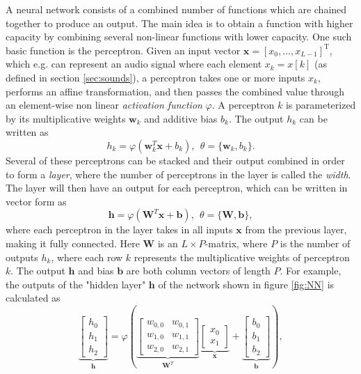 \documentclass{report}
\begin{document}
A neural network consists of a combined number of functions which are chained together to produce an output. The main idea is to obtain a function with higher capacity by combining several non-linear functions with lower capacity. One such basic function is the perceptron. Given an input vector $\bm{x}=[x_0, \dots, x_{L-1}]^\text{T}$, which e.g. can represent an audio signal where each element $x_k = x[k]$ (as defined in section \ref{sec:sounds}), a perceptron takes one or more inputs $x_k$, performs an affine transformation, and then passes the combined value through an element-wise non linear \textit{activation function} $\varphi$. A perceptron $k$ is parameterized by its multiplicative weights $\bm{w}_k$ and additive bias $b_k$. The output $h_k$ can be written as
\begin{equation} \label{eq:perc}
    h_k = \varphi\left( \bm{w}^T_k \bm{x} + b_k \right), \ \ \theta = \{ \bm{w}_k, b_k\}.
\end{equation}
Several of these perceptrons can be stacked and their output combined in order to form a \textit{layer}, where the number of perceptrons in the layer is called the \textit{width}. The layer will then have an output for each perceptron, which can be written in vector form as
\begin{equation}
    \bm{h} = \varphi\left( \bm{W}^T \bm{x} + \bm{b}\right), \ \ \theta = \{ \bm{W}, \bm{b} \},
\end{equation}
where each perceptron in the layer takes in all inputs $\bm{x}$ from the previous layer, making it fully connected. Here $\bm{W}$ is an $L \times P$-matrix, where $P$ is the number of outputs $h_k$, where each row $k$ represents the multiplicative weights of perceptron $k$. The output $\bm{h}$ and bias $\bm{b}$ are both column vectors of length $P$. For example, the outputs of the "hidden layer" $\bm{h}$ of the network shown in figure \ref{fig:NN} is calculated as
\begin{equation}
\underbrace{
\left[
    \begin{array}{c}
         h_0 \\
         h_1 \\
         h_2
    \end{array} \right]}_{\bm{h}}
= \varphi \left(
\underbrace{\left[ \begin{array}{cc}
     w_{0,0} & w_{0,1} \\
     w_{1,0} & w_{1,1} \\
     w_{2,0} & w_{2,1}
\end{array} \right]}_{\bm{W}^T}
\underbrace{
\left[ 
\begin{array}{c}
     x_0  \\
     x_1 
\end{array}
\right]}_{\bm{x}} +
\underbrace{\left[ 
\begin{array}{c}
    b_0 \\
    b_1 \\
    b_2
\end{array}
\right]}_{\bm{b}}
\right),
\end{equation}
\end{document}
